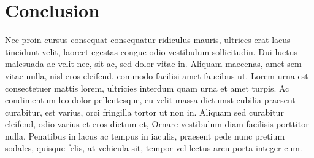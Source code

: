\documentclass{article}
\begin{document}
\section{Conclusion}
Nec proin cursus consequat consequatur ridiculus mauris, ultrices erat lacus tincidunt velit,
laoreet egestas congue odio vestibulum sollicitudin. Dui luctus malesuada ac velit nec, sit ac, sed dolor vitae in.
Aliquam maecenas, amet sem vitae nulla, nisl eros eleifend, commodo facilisi amet faucibus ut.
Lorem urna est consectetuer mattis lorem, ultricies interdum quam urna et amet turpis.
Ac condimentum leo dolor pellentesque, eu velit massa dictumst cubilia praesent curabitur, est varius,
orci fringilla tortor ut non in. Aliquam sed curabitur eleifend, odio varius et eros dictum et,
Ornare vestibulum diam facilisis porttitor nulla. Penatibus in lacus ac tempus in iaculis,
praesent pede nunc pretium sodales, quisque felis, at vehicula sit, tempor vel lectus arcu porta integer cum.
\end{document}

